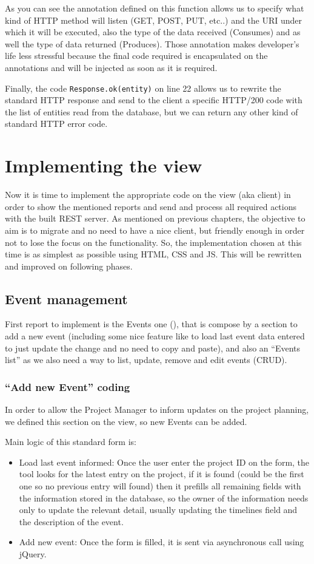 As you can see the annotation defined on this function allows us to specify what
kind of HTTP method will listen (GET, POST, PUT, etc..) and the URI under which
it will be executed, also the type of the data received (Consumes) and as well
the type of data returned (Produces). Those annotation makes developer's
life less stressful because the final code required is encapsulated on the
annotations and will be injected as soon as it is required.

Finally, the code \texttt{Response.ok(entity)} on line 22 allows us to rewrite
the standard HTTP response and send to the client a specific HTTP/200 code with the
list of entities read from the database, but we can return any other kind of
standard HTTP error code.

\section{Implementing the view}
Now it is time to implement the appropriate code on the view (aka client) in
order to show the mentioned reports and send and process all required actions with
the built REST server. As mentioned on previous chapters, the objective to aim
is to migrate and no need to have a nice client, but friendly enough in order
not to lose the focus on the functionality. So, the implementation chosen at this
time is as simplest as possible using HTML, CSS and JS. This will be rewritten
and improved on following phases.

\subsection{Event management}
First report to implement is the Events one (), that
is compose by a section to add a new event (including some nice feature like to
load last event data entered to just update the change and no need to copy and
paste), and also an ``Events list'' as we also need a way to list, update,
remove and edit events (CRUD).

\subsubsection{``Add new Event'' coding}
In order to allow the Project Manager to inform updates on the project planning,
we defined this section on the view, so new Events can be added.

Main logic of this standard form is:
\begin{itemize}
  \item Load last event informed: Once the user enter the project ID on the
  form, the tool looks for the latest entry on the project, if it is found
  (could be the first one so no previous entry will found) then it prefills all
  remaining fields with the information stored in the database, so the owner of
  the information needs only to update  the relevant detail, usually updating
  the timelines field and the description of the event.
  \item Add new event: Once the form is filled, it is sent via asynchronous call
  using jQuery.
\end{itemize}

